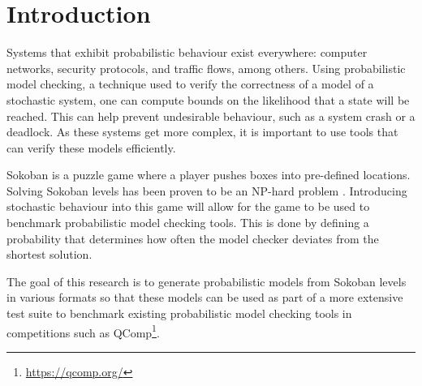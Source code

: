 \section{Introduction}
Systems that exhibit probabilistic behaviour exist everywhere: computer networks, security protocols, and traffic flows, among others. Using probabilistic model checking, a technique used to verify the correctness of a model of a stochastic system, one can compute bounds on the likelihood that a state will be reached. This can help prevent undesirable behaviour, such as a system crash or a deadlock. As these systems get more complex, it is important to use tools that can verify these models efficiently.

Sokoban is a puzzle game where a player pushes boxes into pre-defined locations. Solving Sokoban levels has been proven to be an NP-hard problem \cite{sokoban-np}. Introducing stochastic behaviour into this game will allow for the game to be used to benchmark probabilistic model checking tools. This is done by defining a probability that determines how often the model checker deviates from the shortest solution.

The goal of this research is to generate probabilistic models from Sokoban levels in various formats so that these models can be used as part of a more extensive test suite to benchmark existing probabilistic model checking tools in competitions such as QComp\footnote{\url{https://qcomp.org/}}.
